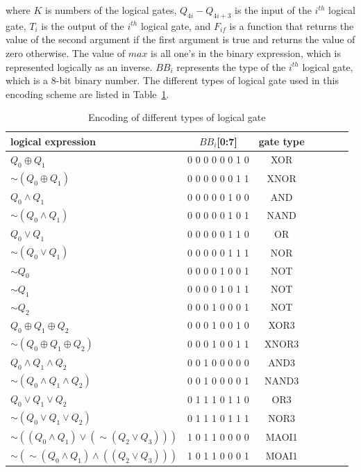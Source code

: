 \documentclass[sn-basic]{sn-jnl}%
\begin{document}
where $K$ is numbers of the logical gates, $Q_{4i}-Q_{4i+3}$ is the input of the $i^{th}$ logical gate, $T_i$ is the output of the $i^{th}$ logical gate, and $F_{if}$ is a function that returns the value of the second argument if the first argument is true and returns the value of zero otherwise.
The value of $max$ is all one's in the binary expression, which is represented logically as an inverse.
$BB_i$ represents the type of the $i^{th}$ logical gate, which is a 8-bit binary number. The different types of logical gate used in this encoding scheme are listed in Table~\ref{tab3}.


\begin{table}[h]
    \caption{Encoding of different types of logical gate}\label{tab3}%
    \begin{tabular*}{\textwidth}{@{\extracolsep\fill}lcccccc}
        \toprule
        logical expression & $BB_i$[0:7] & gate type \\
        \midrule
        $Q_0 \oplus Q_1$ & 0 0 0 0 0 0 1 0 & XOR \\
        $\sim (Q_0 \oplus Q_1)$ & 0 0 0 0 0 0 1 1 & XNOR \\
        $Q_0 \land Q_1$ & 0 0 0 0 0 1 0 0 & AND \\
        $\sim (Q_0 \land Q_1)$ & 0 0 0 0 0 1 0 1 & NAND \\
        $Q_0 \lor Q_1$ & 0 0 0 0 0 1 1 0 & OR \\
        $\sim (Q_0 \lor Q_1)$ & 0 0 0 0 0 1 1 1 & NOR \\
        $\sim Q_0$ & 0 0 0 0 1 0 0 1 & NOT \\
        $\sim Q_1$ & 0 0 0 0 1 0 1 1 & NOT \\
        $\sim Q_2$ & 0 0 0 1 0 0 0 1 & NOT \\
        $Q_0 \oplus Q_1 \oplus Q_2$ & 0 0 0 1 0 0 1 0 & XOR3 \\
        $\sim (Q_0 \oplus Q_1 \oplus Q_2)$ & 0 0 0 1 0 0 1 1 & XNOR3 \\
        $Q_0 \land Q_1 \land Q_2$ & 0 0 1 0 0 0 0 0 & AND3 \\
        $\sim (Q_0 \land Q_1 \land Q_2)$ & 0 0 1 0 0 0 0 1 & NAND3 \\
        $Q_0 \lor Q_1 \lor Q_2$ & 0 1 1 1 0 1 1 0 & OR3 \\
        $\sim (Q_0 \lor Q_1 \lor Q_2)$ & 0 1 1 1 0 1 1 1 & NOR3 \\
        $\sim ((Q_0 \land Q_1) \lor (\sim (Q_2 \lor Q_3)))$ & 1 0 1 1 0 0 0 0 & MAOI1 \\
        $\sim (\sim (Q_0 \land Q_1) \land ((Q_2 \lor Q_3)))$ & 1 0 1 1 0 0 0 1 & MOAI1 \\
        \bottomrule
    \end{tabular*}
\end{table}
\end{document}
